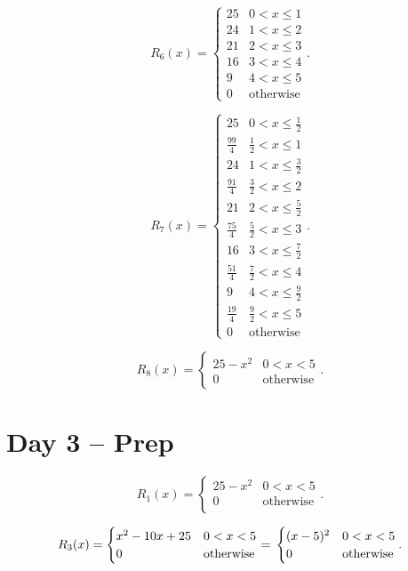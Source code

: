 \documentclass[letterpaper,oneside]{book}%
\theoremstyle{plain}
\theoremstyle{box}
\theoremstyle{problem}
\begin{document}
$$R_6(x) = 
    \begin{cases}
    25 & 0 < x \leq 1 \\
    24 & 1 < x \leq 2 \\
    21 & 2 < x \leq 3 \\
    16 & 3 < x \leq 4 \\
    9 & 4 < x \leq 5 \\
    0 & \text{otherwise}
    \end{cases}.$$

$$R_7(x) = 
    \begin{cases}
    25 & 0 < x \leq \frac{1}{2} \\
    \frac{99}{4} & \frac{1}{2} < x \leq 1 \\
    24 & 1 < x \leq \frac{3}{2} \\
    \frac{91}{4} & \frac{3}{2} < x \leq 2 \\
    21 & 2 < x \leq \frac{5}{2} \\
    \frac{75}{4} & \frac{5}{2} < x \leq 3 \\
    16 & 3 < x \leq \frac{7}{2} \\
    \frac{51}{4} & \frac{7}{2} < x \leq 4 \\
    9 & 4 < x \leq \frac{9}{2} \\
    \frac{19}{4} & \frac{9}{2} < x \leq 5 \\
    0 & \text{otherwise}
    \end{cases}.$$
    
$$R_8(x) = 
    \begin{cases}
    25-x^2 & 0 < x < 5 \\
    0 & \text{otherwise}
    \end{cases}.$$



\section{Day 3 -- Prep}
$$R_1(x) = 
    \begin{cases}
    25-x^2 & 0 < x < 5 \\
    0 & \text{otherwise} \\
    \end{cases}.$$

$$R_3(x) = 
    \begin{cases}
    x^2 - 10x + 25 & 0 < x < 5 \\
    0 & \text{otherwise} \\
    \end{cases} = \\
    \begin{cases}
    (x-5)^2 & 0 < x < 5 \\
    0 & \text{otherwise}
    \end{cases}.$$
\end{document}
